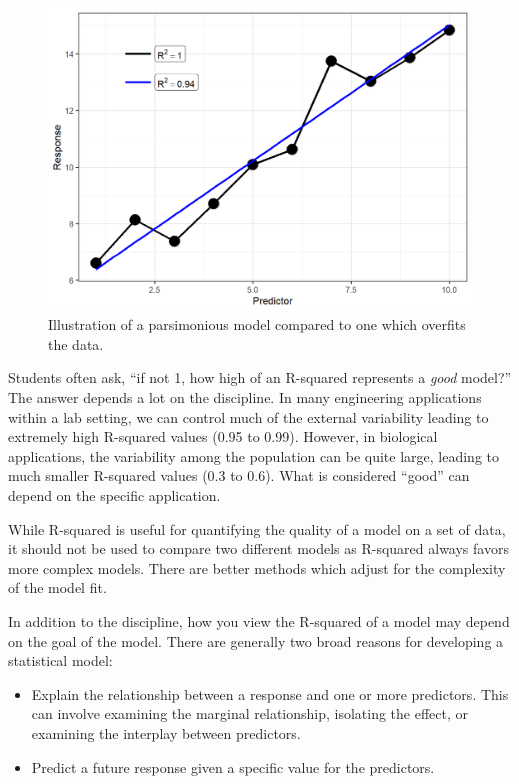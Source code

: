 \documentclass[
]{book}
\providecommand{\tightlist}{%
  \setlength{\itemsep}{0pt}\setlength{\parskip}{0pt}}
\theoremstyle{plain}
\theoremstyle{mydefn}
\theoremstyle{myexmpl}
\theoremstyle{remark}
\begin{document}
\begin{figure}

{\centering \includegraphics[width=0.8\linewidth]{./Images/regquality-overfit-1} 

}

\caption{Illustration of a parsimonious model compared to one which overfits the data.}\label{fig:regquality-overfit}
\end{figure}

Students often ask, ``if not 1, how high of an R-squared represents a \emph{good} model?'' The answer depends a lot on the discipline. In many engineering applications within a lab setting, we can control much of the external variability leading to extremely high R-squared values (0.95 to 0.99). However, in biological applications, the variability among the population can be quite large, leading to much smaller R-squared values (0.3 to 0.6). What is considered ``good'' can depend on the specific application.

\begin{rmdtip}
While R-squared is useful for quantifying the quality of a model on a set of data, it should not be used to compare two different models as R-squared always favors more complex models. There are better methods which adjust for the complexity of the model fit.
\end{rmdtip}

In addition to the discipline, how you view the R-squared of a model may depend on the goal of the model. There are generally two broad reasons for developing a statistical model:

\begin{itemize}
\tightlist
\item
  Explain the relationship between a response and one or more predictors. This can involve examining the marginal relationship, isolating the effect, or examining the interplay between predictors.
\item
  Predict a future response given a specific value for the predictors.
\end{itemize}
\end{document}
